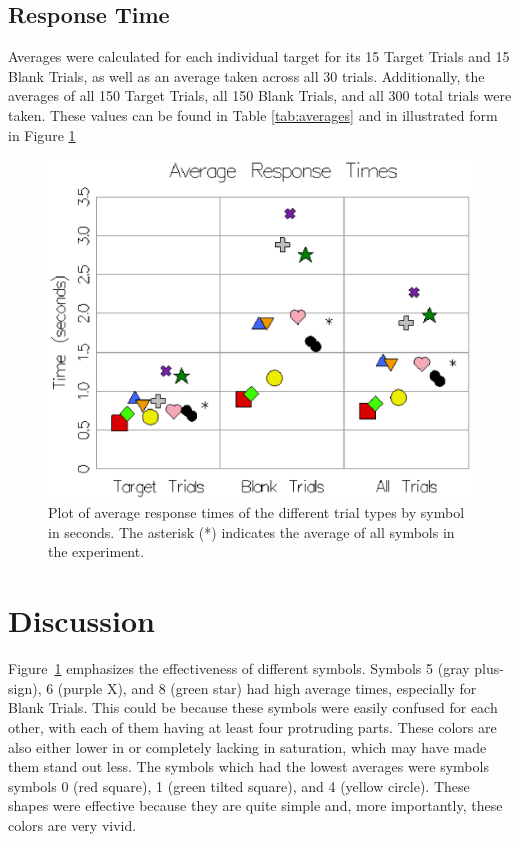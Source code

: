\documentclass{article} %
\begin{document}
\subsection{Response Time}

Averages were calculated for each individual target for its 15 Target Trials and 15 Blank Trials, as well as an average taken across all 30 trials.  Additionally, the averages of all 150 Target Trials, all 150 Blank Trials, and all 300 total trials were taken.  These values can be found in Table \ref{tab:averages} and in illustrated form in Figure \ref{fig:averages}

\begin{figure}[htb]
	\includegraphics[width=12cm]{images/average-response-times.eps}
	\caption{Plot of average response times of the different trial types by symbol in seconds.  The asterisk (*) indicates the average of all symbols in the experiment.}
	\label{fig:averages}
\end{figure}

\section{Discussion}

Figure~\ref{fig:averages} emphasizes the effectiveness of different symbols.  Symbols 5 (gray plus-sign), 6 (purple X), and 8 (green star) had high average times, especially for Blank Trials.  This could be because these symbols were easily confused for each other, with each of them having at least four protruding parts.  These colors are also either lower in or completely lacking in saturation, which may have made them stand out less.  The symbols which had the lowest averages were symbols symbols 0 (red square), 1 (green tilted square), and 4 (yellow circle).  These shapes were effective because they are quite simple and, more importantly, these colors are very vivid.
\end{document}
